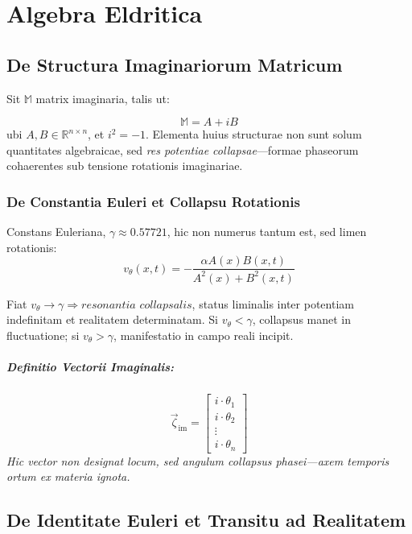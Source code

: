 {\frakfamily
\chapter*{Algebra Eldritica}

\section*{De Structura Imaginariorum Matricum}

Sit \( \mathbb{M} \) matrix imaginaria, talis ut:}
\[
\mathbb{M} = A + iB
\]
ubi \( A, B \in \mathbb{R}^{n \times n} \), et \( i^2 = -1 \). Elementa huius structurae non sunt solum quantitates algebraicae, sed \textit{res potentiae collapsae}—formae phaseorum cohaerentes sub tensione rotationis imaginariae.

\subsection*{De Constantia Euleri et Collapsu Rotationis}

Constans Euleriana, \( \gamma \approx 0.57721 \), hic non numerus tantum est, sed limen rotationis:
\[
v_\theta(x, t) = -\frac{\alpha A(x) B(x, t)}{A^2(x) + B^2(x, t)}
\]

Fiat \( v_\theta \rightarrow \gamma \Rightarrow \textit{resonantia collapsalis} \), status liminalis inter potentiam indefinitam et realitatem determinatam.  
Si \( v_\theta < \gamma \), collapsus manet in fluctuatione;  
si \( v_\theta > \gamma \), manifestatio in campo reali incipit.

\paragraph{Definitio Vectorii Imaginalis:}
\[
\vec{\zeta}_{\text{im}} =
\begin{bmatrix}
i \cdot \theta_1 \\
i \cdot \theta_2 \\
\vdots \\
i \cdot \theta_n
\end{bmatrix}
\]
\textit{Hic vector non designat locum, sed angulum collapsus phasei—axem temporis ortum ex materia ignota.}

\section*{De Identitate Euleri et Transitu ad Realitatem}

